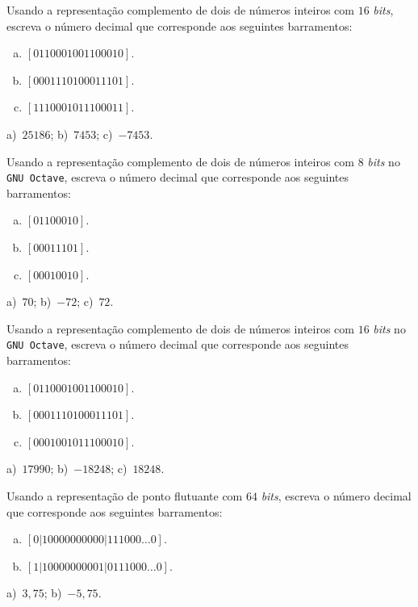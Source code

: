 \begin{exer}
  Usando a representação complemento de dois de números inteiros com $16$ \emph{bits}, escreva o número decimal que corresponde aos seguintes barramentos:
  \begin{enumerate}[a)]
  \item $[0110001001100010]$.
  \item $[0001110100011101]$.
  \item $[1110001011100011]$.
  \end{enumerate}
\end{exer}
\begin{resp}
  a)~$25186$; b)~$7453$; c)~$-7453$.
\end{resp}


\ifisoctave
\begin{exer}
  Usando a representação complemento de dois de números inteiros com $8$ \emph{bits} no \verb+GNU Octave+, escreva o número decimal que corresponde aos seguintes barramentos:
  \begin{enumerate}[a)]
  \item $[01100010]$.
  \item $[00011101]$.
  \item $[00010010]$.
  \end{enumerate}
\end{exer}
\begin{resp}
  a)~$70$; b)~$-72$; c)~$72$.
\end{resp}
\fi

\ifisoctave
\begin{exer}
  Usando a representação complemento de dois de números inteiros com $16$ \emph{bits} no \verb+GNU Octave+, escreva o número decimal que corresponde aos seguintes barramentos:
  \begin{enumerate}[a)]
  \item $[0110001001100010]$.
  \item $[0001110100011101]$.
  \item $[0001001011100010]$.
  \end{enumerate}
\end{exer}
\begin{resp}
  a)~$17990$; b)~$-18248$; c)~$18248$.
\end{resp}
\fi

\begin{exer}
  Usando a representação de ponto flutuante com $64$ \emph{bits}, escreva o número decimal que corresponde aos seguintes barramentos:
  \begin{enumerate}[a)]
  \item $[0|10000000000|111000\ldots 0]$.
  \item $[1|10000000001|0111000\ldots 0]$.
  \end{enumerate}
\end{exer}
\begin{resp}
  a)~$3,75$; b)~$-5,75$.
\end{resp}

